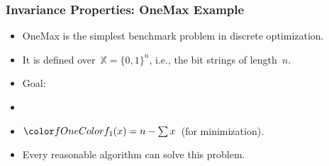 \documentclass[aspectratio=169,mathserif,notheorems]{beamer}%
\gdef\searchSpace{\ensuremath{\mathbb{X}}}%
\begin{document}
%
\begin{frame}%
\frametitle{Invariance Properties: OneMax Example}%
\parbox{0.415\paperwidth}{%
\begin{itemize}%
\item OneMax is the simplest benchmark problem in discrete optimization\cite{M1992HGARWMAH}.%
\item<2-> It is defined over~$\searchSpace=\{0,1\}^n$, i.e., the bit strings of length~$n$.%
\item<3-> Goal:~%
\item<4-> %
\item<5-> $\fn{1}(x)=n-\sum{x}$~(for minimization).%
\item<6-> Every reasonable algorithm can solve this problem.%
\end{itemize}%
}%
%
%
%
\end{frame}%
%
%
\end{document}
